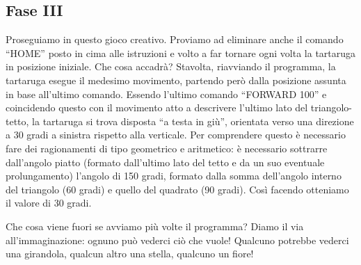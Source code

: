 \subsection{Fase III}

Proseguiamo in questo gioco creativo. Proviamo ad eliminare anche il comando
“HOME” posto in cima alle istruzioni e volto a far tornare ogni volta la
tartaruga in posizione iniziale. Che cosa accadrà? Stavolta, riavviando il
programma, la tartaruga esegue il medesimo movimento, partendo però dalla
posizione assunta in base all’ultimo comando. Essendo l’ultimo comando “FORWARD
100” e coincidendo questo con il movimento atto a descrivere l’ultimo lato del
triangolo-tetto, la tartaruga si trova disposta “a testa in giù”, orientata
verso una direzione a 30 gradi a sinistra rispetto alla verticale. Per
comprendere questo è necessario fare dei ragionamenti di tipo geometrico e
aritmetico: è necessario sottrarre dall’angolo piatto (formato dall’ultimo lato
del tetto e da un suo eventuale prolungamento) l’angolo di 150 gradi, formato
dalla somma dell’angolo interno del triangolo (60 gradi) e quello del quadrato
(90 gradi). Così facendo otteniamo il valore di 30 gradi.

Che cosa viene fuori se avviamo più volte il programma? Diamo il via
all’immaginazione: ognuno può vederci ciò che vuole! Qualcuno potrebbe vederci
una girandola, qualcun altro una stella, qualcuno un fiore!

